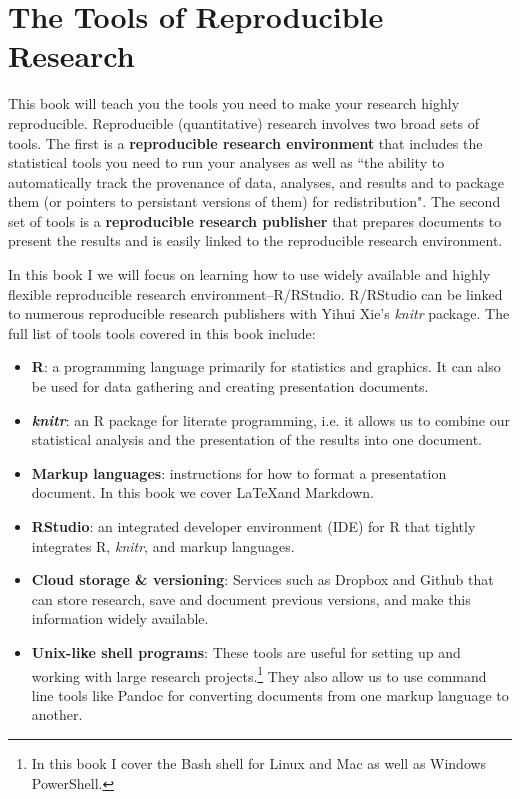 \documentclass[ChapterTOCs,krantz1]{krantz}\usepackage{graphicx, color}
\begin{document}
\section{The Tools of Reproducible Research}

This book will teach you the tools you need to make your research highly reproducible. Reproducible (quantitative) research involves two broad sets of tools. The first is a {\bf{reproducible research environment}} that includes the statistical tools you need to run your analyses as well as ``the ability to automatically track the provenance of data, analyses, and results and to package them (or pointers to persistant versions of them) for redistribution". The second set of tools is a {\bf{reproducible research publisher}} that prepares documents to present the results and is easily linked to the reproducible research environment.\cite{Mesirov2010}

In this book I we will focus on learning how to use widely available and highly flexible reproducible research environment--R/RStudio. R/RStudio can be linked to numerous reproducible research publishers with Yihui Xie's {\emph{knitr}} package\cite{knitr}. The full list of tools tools covered in this book include:

\begin{itemize}
    \item {\bf{R}}: a programming language primarily for statistics and graphics. It can also be used for data gathering and creating presentation documents.
    
    \item {\bf{{\emph{knitr}}}}: an R package for literate programming, i.e. it allows us to combine our statistical analysis and the presentation of the results into one document.
    
    \item {\bf{Markup languages}}: instructions for how to format a presentation document. In this book we cover \LaTeX and Markdown.  
    
    \item {\bf{RStudio}}: an integrated developer environment (IDE) for R that tightly integrates R, {\emph{knitr}}, and markup languages.
    
    \item {\bf{Cloud storage \& versioning}}: Services such as Dropbox and Github that can store research, save and document previous versions, and make this information widely available.
    
    \item {\bf{Unix-like shell programs}}: These tools are useful for setting up and working with large research projects.\footnote{In this book I cover the Bash shell for Linux and Mac as well as Windows PowerShell.} They also allow us to use command line tools like Pandoc for converting documents from one markup language to another.
\end{itemize}
\end{document}
